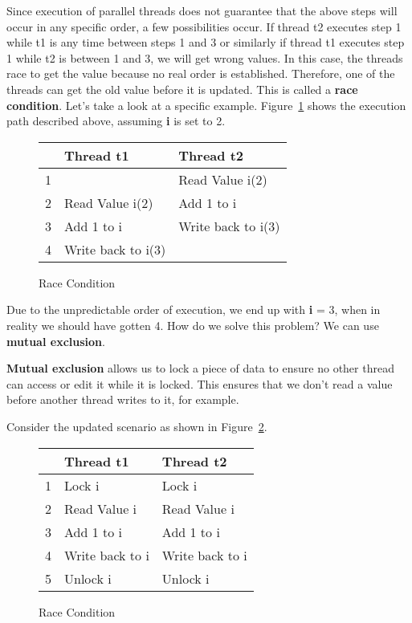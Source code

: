 \documentclass[letterpaper, 11pt]{article}
\begin{document}
Since execution of parallel threads does not guarantee that the above steps will occur in
any specific order, a few possibilities occur. If thread t2 executes step 1 while
t1 is any time between steps 1 and 3 or similarly if thread t1 executes step 1 while
t2 is between 1 and 3, we will get wrong values. In this case, the threads race
to get the value because no real order is established. Therefore, one of the
threads can get the old value before it is updated. This is called a {\bfseries race condition}.
Let's take a look at a specific example. Figure~\ref{fig:race_cond_2} shows the execution path described
above, assuming {\bfseries i} is set to 2.

\begin{figure}[H]
\centering
\begin{tabular}{|l|l|l|}
	\hline
	& {\bfseries Thread t1} & {\bfseries Thread t2} \\
	\hline
	1 &  & Read Value i(2) \\
	\hline
	2 & Read Value i(2) & Add 1 to i \\
	\hline
	3 & Add 1 to i & Write back to i(3) \\
	\hline
	4 & Write back to i(3) &  \\
	\hline
\end{tabular}
\caption{Race Condition}
\label{fig:race_cond_2}
\end{figure}

Due to the unpredictable order of execution, we end up with {\bfseries i} = 3,
when in reality we should have gotten 4. How do we solve this problem?
We can use {\bfseries mutual exclusion}.
\par\vspace{\baselineskip}

{\bfseries Mutual exclusion} allows us to lock a piece of data to ensure no other thread can
access  or edit it while it is locked. This ensures that we don't read a value
before another thread writes to it, for example.

\par\vspace{\baselineskip}

Consider the updated scenario as shown in Figure~\ref{fig:race_cond_3}.

\begin{figure}[H]
\centering
\begin{tabular}{|l|l|l|}
	\hline
	& {\bfseries Thread t1} & {\bfseries Thread t2} \\
	\hline
	1 & Lock i & Lock i \\
	\hline
	2 & Read Value i & Read Value i\\
	\hline
	3 & Add 1 to i & Add 1 to i \\
	\hline
	4 & Write back to i & Write back to i \\
	\hline
	5 & Unlock i & Unlock i \\
	\hline
\end{tabular}
\caption{Race Condition}
\label{fig:race_cond_3}
\end{figure}
\end{document}
